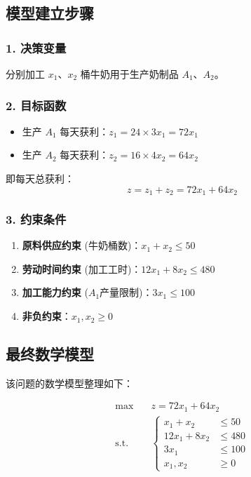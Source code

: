 \documentclass[a4paper,12pt]{ctexart} %
\begin{document}
	\subsection{模型建立步骤}
	
	\subsubsection*{1. 决策变量}
	分别加工 $x_1$、$x_2$ 桶牛奶用于生产奶制品 $A_1$、$A_2$。
	
	\subsubsection*{2. 目标函数}
	\begin{itemize}
		\item 生产 $A_1$ 每天获利：$z_1 = 24 \times 3x_1 = 72x_1$
		\item 生产 $A_2$ 每天获利：$z_2 = 16 \times 4x_2 = 64x_2$
	\end{itemize}
	即每天总获利：
	$$ z = z_1 + z_2 = 72x_1 + 64x_2 $$
	
	\subsubsection*{3. 约束条件}
	\begin{enumerate}
		\item \textbf{原料供应约束} (牛奶桶数)：$x_1 + x_2 \leq 50$
		\item \textbf{劳动时间约束} (加工工时)：$12x_1 + 8x_2 \leq 480$
		\item \textbf{加工能力约束} ($A_1$产量限制)：$3x_1 \leq 100$
		\item \textbf{非负约束}：$x_1, x_2 \geq 0$
	\end{enumerate}
	
	\subsection{最终数学模型}
	
	该问题的数学模型整理如下：
	
	\begin{equation}
		\begin{aligned}
			\max \quad & z = 72x_1 + 64x_2 \\
			\text{s.t.} \quad & \left\{
			\begin{aligned}
				x_1 + x_2 & \leq 50 \\
				12x_1 + 8x_2 & \leq 480 \\
				3x_1 & \leq 100 \\
				x_1, x_2 & \geq 0
			\end{aligned}
			\right.
		\end{aligned}
	\end{equation}
\end{document}
